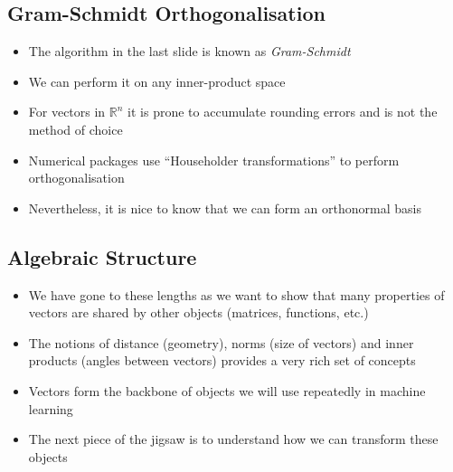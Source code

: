 
\begin{slide}
\section{Gram-Schmidt Orthogonalisation}

\begin{PauseHighLight}
  \begin{itemize}
  \item The algorithm in the last slide is known as
    \emph{Gram-Schmidt}\pause
  \item We can perform it on any inner-product space\pause
  \item For vectors in $\mathbb{R}^n$ it is prone to accumulate
    rounding errors and is not the method of choice\pause
  \item Numerical packages use ``Householder transformations'' to
    perform orthogonalisation\pause
  \item Nevertheless, it is nice to know that we can form an
    orthonormal basis\pause
  \end{itemize}
\end{PauseHighLight}

\end{slide}




\begin{slide}
\section[-1]{Algebraic Structure}

\begin{PauseHighLight}
  \begin{itemize}
  \item We have gone to these lengths as we want to show that many
    properties of vectors are shared by other objects (matrices,
    functions, etc.)\pause
  \item The notions of distance (geometry), norms (size of vectors) and
    inner products (angles between vectors) provides a very rich set
    of concepts\pause
  \item Vectors form the backbone of  objects we will use repeatedly in
    machine learning\pause
  \item The next piece of the jigsaw is to understand how we can
    transform these objects\pause
  \end{itemize}
\end{PauseHighLight}

\end{slide}

